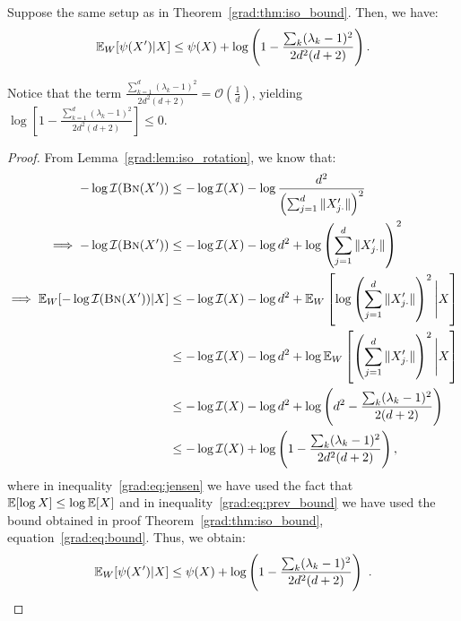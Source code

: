 \begin{corollary}
\label{grad:cor:isogap_bound}
Suppose the same setup as in Theorem~\ref{grad:thm:iso_bound}. Then, we have:
\begin{align}
    \mathbb{E}_W[\psi(X') | X] \leq \psi(X) + \log \left(1 - \frac{\sum_k(\lambda_k - 1)^2}{2d^2(d+2)}\right).
\end{align}
\begin{remark}
    Notice that the term $\frac{\sum_{k=1}^d (\lambda_k - 1)^2}{2d^2(d+2)} = \mathcal{O}(\frac{1}{d})$, yielding $\log\left[1 - \frac{\sum_{k=1}^d (\lambda_k - 1)^2}{2d^2(d+2)} \right] \leq 0$.
\end{remark}
\end{corollary}
%
\begin{proof}
    From Lemma~\ref{grad:lem:iso_rotation}, we know that:
        \begin{align}
            -\log\mathcal{I}(\text{\sc{Bn}}(X')) &\leq -\log\mathcal{I}(X) - \log\frac{d^2}{\left(\sum_{j=1}^d \| X_{j\cdot}' \|\right)^2} \\
            \implies  -\log\mathcal{I}(\text{\sc{Bn}}(X')) &\leq -\log\mathcal{I}(X) - \log{d^2} + \log \left(\sum_{j=1}^d \| X_{j\cdot}' \|\right)^2 \\
            \implies \mathbb{E}_W[-\log\mathcal{I}(\text{\sc{Bn}}(X')) | X] 
            &\leq -\log\mathcal{I}(X) - \log{d^2} + \mathbb{E}_W\left[ \log \left(\sum_{j=1}^d \| X_{j\cdot}' \|\right)^2  \Bigg| X \right] \\
            &\leq -\log\mathcal{I}(X) - \log{d^2} + \log \mathbb{E}_W \left[ \left(\sum_{j=1}^d \| X_{j\cdot}' \|\right)^2 \Bigg| X \right] \label{grad:eq:jensen} \\
            &\leq -\log\mathcal{I}(X) - \log{d^2} + \log \left(d^2 - \frac{\sum_k(\lambda_k - 1)^2}{2(d+2)}\right) \label{grad:eq:prev_bound} \\
            &\leq -\log\mathcal{I}(X) + \log \left(1 - \frac{\sum_k(\lambda_k - 1)^2}{2d^2(d+2)} \right),
        \end{align}
    where in inequality~\ref{grad:eq:jensen} we have used the fact that $\mathbb{E} [\log X] \leq \log \mathbb{E}[X]$ and in inequality~\ref{grad:eq:prev_bound} we have used the bound obtained in proof Theorem~\ref{grad:thm:iso_bound}, equation~\ref{grad:eq:bound}.
    Thus, we obtain:
    \begin{align}
        \mathbb{E}_W[\psi(X') | X] \leq \psi(X) + \log \left(1 - \frac{\sum_k(\lambda_k - 1)^2}{2d^2(d+2)}\right)~.
    \end{align}
\end{proof}

\label{grad:sec:conditional_orthonality}

